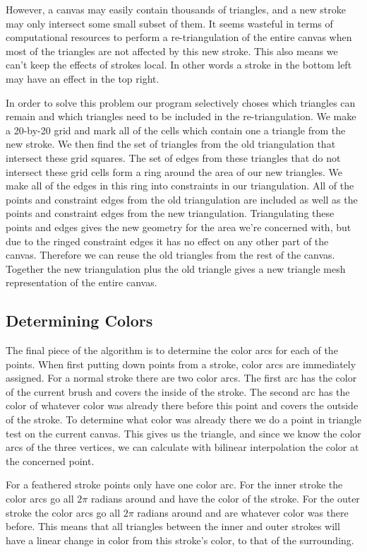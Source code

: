 \documentclass[conference]{acmsiggraph}
\begin{document}
However, a canvas may easily contain thousands of triangles, and a new stroke may only 
intersect some small subset of them. It seems wasteful in terms of computational
resources to perform a re-triangulation of the entire canvas when most of the triangles
are not affected by this new stroke. This also means we can't keep the effects of
strokes local. In other words a stroke in the bottom left may have an effect in the top
right.

In order to solve this problem our program selectively choses which triangles can remain
and which triangles need to be included in the re-triangulation. We make a 20-by-20 grid
and mark all of the cells which contain one a triangle from the new stroke. We then
find the set of triangles from the old triangulation that intersect these grid squares.
The set of edges from these triangles that do not intersect these grid cells form a ring
around the area of our new triangles. We make all of the edges in this ring into constraints
in our triangulation. All of the points and constraint edges from the old triangulation are
included as well as the points and constraint edges from the new triangulation. Triangulating
these points and edges gives the new geometry for the area we're concerned with, but due
to the ringed constraint edges it has no effect on any other part of the canvas. Therefore
we can reuse the old triangles from the rest of the canvas. Together the new triangulation
plus the old triangle gives a new triangle mesh representation of the entire canvas.

\subsection{Determining Colors}
The final piece of the algorithm is to determine the color arcs for each of the points.
When first putting down points from a stroke, color arcs are immediately assigned. For
a normal stroke there are two color arcs. The first arc has the color of the current
brush and covers the inside of the stroke. The second arc has the color of whatever color was
already there before this point and covers the outside of the stroke. To determine
what color was already there we do a point in triangle test on the current canvas. This
gives us the triangle, and since we know the color arcs of the three vertices, we can calculate
with bilinear interpolation the color at the concerned point.

For a feathered stroke points only have one color arc. For the inner stroke the color arcs
go all $2\pi$ radians around and have the color of the stroke. For the outer stroke the
color arcs go all $2\pi$ radians around and are whatever color was there before. This means
that all triangles between the inner and outer strokes will have a linear change in color
from this stroke's color, to that of the surrounding.
\end{document}
